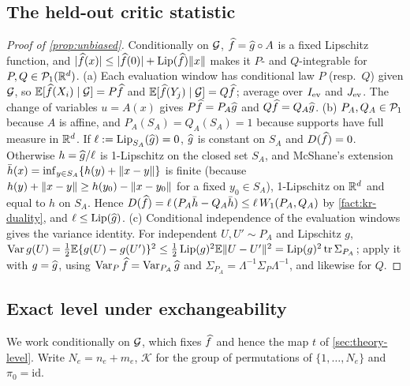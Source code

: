\subsection{The held-out critic statistic}\label{app:proofs-critic}

\begin{proof}[Proof of \cref{prop:unbiased}]
Conditionally on $\mathcal{G}$, $\widehat{f}=\widehat{g}\circ A$ is a fixed Lipschitz function, and
$\lvert\widehat{f}(x)\rvert\le\lvert\widehat{f}(0)\rvert+\operatorname{Lip}(\widehat{f})\lVert x\rVert$ makes it $P$- and $Q$-integrable for
$P,Q\in\mathcal{P}_{1}(\mathbb{R}^d)$.
(a) Each evaluation window has conditional law $P$ (resp.\ $Q$) given $\mathcal{G}$, so
$\mathbb{E}[\widehat{f}(X_i)\mid\mathcal{G}]=P\widehat{f}$ and $\mathbb{E}[\widehat{f}(Y_j)\mid\mathcal{G}]=Q\widehat{f}$; average over $I_{\mathrm{ev}}$ and
$J_{\mathrm{ev}}$. The change of variables $u=A(x)$ gives $P\widehat{f}=P_A\widehat{g}$ and $Q\widehat{f}=Q_A\widehat{g}$.
(b) $P_A,Q_A\in\mathcal{P}_{1}$ because $A$ is affine, and $P_A(S_A)=Q_A(S_A)=1$ because supports have
full measure in $\mathbb{R}^d$. If $\ell:=\operatorname{Lip}_{S_A}(\widehat{g})=0$, $\widehat{g}$ is constant on $S_A$ and
$D(\widehat{f})=0$. Otherwise $h=\widehat{g}/\ell$ is 1-Lipschitz on the closed set $S_A$, and McShane's
extension $\bar h(x)=\inf_{y\in S_A}\{h(y)+\lVert x-y\rVert\}$ is finite (because
$h(y)+\lVert x-y\rVert\ge h(y_0)-\lVert x-y_0\rVert$ for a fixed $y_0\in S_A$), 1-Lipschitz on $\mathbb{R}^d$ and
equal to $h$ on $S_A$. Hence $D(\widehat{f})=\ell\,(P_A\bar h-Q_A\bar h)\le\ell\,W_{1}(P_A,Q_A)$ by
\cref{fact:kr-duality}, and $\ell\le\operatorname{Lip}(\widehat{g})$.
(c) Conditional independence of the evaluation windows gives the variance identity. For
independent $U,U'\sim P_A$ and Lipschitz $g$,
$\operatorname{Var} g(U)=\tfrac12\mathbb{E}\{g(U)-g(U')\}^2\le\tfrac12\operatorname{Lip}(g)^2\mathbb{E}\lVert U-U'\rVert^2=\operatorname{Lip}(g)^2\operatorname{tr}\Sigma_{P_A}$;
apply it with $g=\widehat{g}$, using $\operatorname{Var}_P\widehat{f}=\operatorname{Var}_{P_A}\widehat{g}$ and
$\Sigma_{P_A}=\Lambda^{-1}\Sigma_P\Lambda^{-1}$, and likewise for $Q$.
\end{proof}

\subsection{Exact level under exchangeability}\label{app:proofs-level}

We work conditionally on $\mathcal{G}$, which fixes $\widehat{f}$ and hence the map $t$ of
\cref{sec:theory-level}. Write $N_e=n_e+m_e$, $\mathcal K$ for the group of permutations of
$\{1,\dots,N_e\}$ and $\pi_0=\mathrm{id}$.

